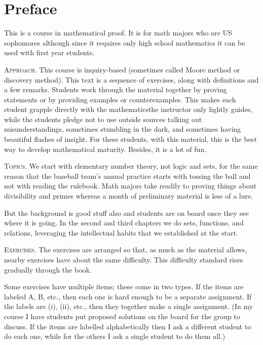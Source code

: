 \chapter*{Preface}

This is a course in mathematical proof. 
It is for math majors who are US sophomores although since
it requires only high school mathematics
it can be used with first year students.



\medskip
\noindent\textsc{Approach.}
This course is inquiry-based (sometimes called Moore method 
or discovery method).
This text is a sequence of exercises,
along with definitions and a few remarks.
Students work through the material together by
proving statements or by providing examples or counterexamples.
This makes each student grapple directly with the 
mathematics\Dash the instructor only 
lightly guides, while the students pledge not to use outside sources\Dash
talking out misunderstandings, 
sometimes stumbling in the dark, and sometimes
having beautiful flashes of insight.
For these students, with this material,
this is the best way to develop mathematical maturity.
Besides, it is a lot of fun.


\medskip
\noindent\textsc{Topics.}
We start with elementary number theory, not logic and sets, 
for the same reason
that the baseball team's annual practice starts with tossing the ball and 
not with reading the rulebook.
Math majors take readily to proving things about
divisibility and primes 
whereas a month of preliminary material is less of a lure.

But the background is good stuff also and 
students are on board once they see where it is going.
In the second and third chapters we do
sets, functions, and relations, leveraging the
intellectual habits that we established at the start.



\medskip
\noindent\textsc{Exercises.}
The exercises are arranged so that, as much as the material allows,
nearby exercises have about the same difficulty.
This difficulty standard rises gradually through the book.

Some exercises have multiple items; these come in two types.
If the items are labeled \textsc{A}, \textsc{B}, etc., 
then each one is hard enough to be a separate assignment.
If the labels are (i), (ii), etc., then they together make
a single assignment.
(In my course I have students put proposed solutions on the board
for the group to discuss.
If the items are labelled alphabetically then I ask a different student
to do each one, while for the others I ask a single student to do them all.)

